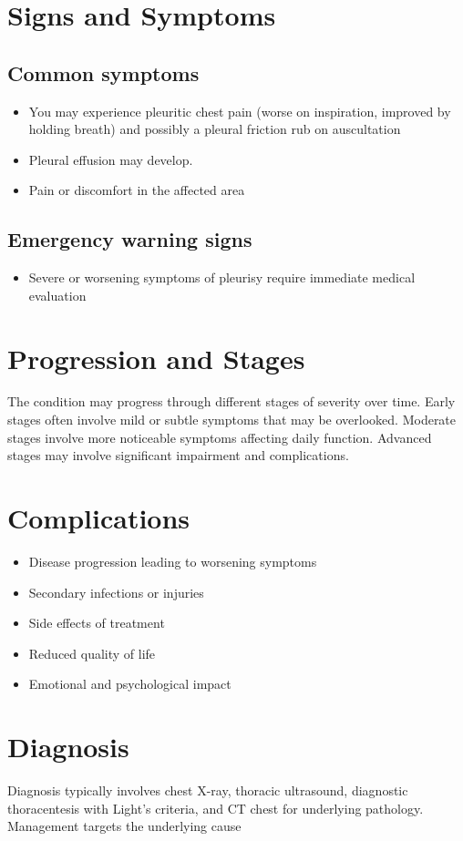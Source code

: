 \section{Signs and Symptoms}

\subsection{Common symptoms}
\begin{itemize}[noitemsep]
  \item You may experience pleuritic chest pain (worse on inspiration, improved by holding breath) and possibly a pleural friction rub on auscultation
  \item Pleural effusion may develop.
  \item Pain or discomfort in the affected area
  \end{itemize}

\subsection{Emergency warning signs}
\begin{itemize}[noitemsep]
  \item Severe or worsening symptoms of pleurisy require immediate medical evaluation
\end{itemize}
\section{Progression and Stages}
The condition may progress through different stages of severity over time. Early stages often involve mild or subtle symptoms that may be overlooked. Moderate stages involve more noticeable symptoms affecting daily function. Advanced stages may involve significant impairment and complications.
\section{Complications}
\begin{itemize}[noitemsep]
  \item Disease progression leading to worsening symptoms
  \item Secondary infections or injuries
  \item Side effects of treatment
  \item Reduced quality of life
  \item Emotional and psychological impact
\end{itemize}
\section{Diagnosis}
Diagnosis typically involves chest X-ray, thoracic ultrasound, diagnostic thoracentesis with Light's criteria, and CT chest for underlying pathology. Management targets the underlying cause


